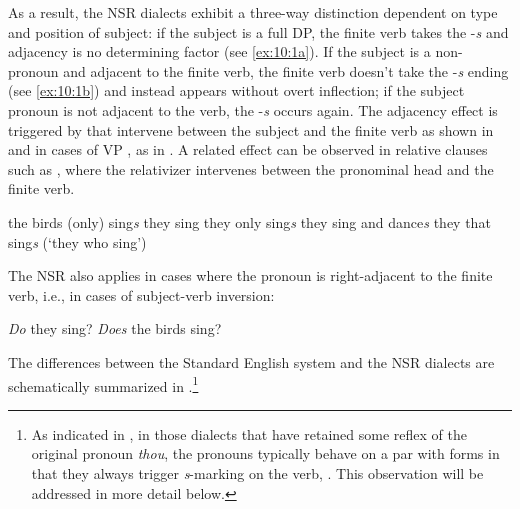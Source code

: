 \documentclass[output=paper]{langsci/langscibook}
\begin{document}
As a result, the \gls{NSR} dialects exhibit a three-way distinction dependent
on type and position of subject: if the subject is a full DP, the finite verb
takes the -\emph{s} and adjacency is no determining factor (see \ref{ex:10:1a}). If the
subject is a non-\Tsg{} pronoun and adjacent to the finite verb, the finite
verb doesn't take the -\emph{s} ending (see \ref{ex:10:1b}) and instead appears without
overt inflection; if the subject pronoun is not adjacent to the verb, the
-\emph{s} occurs again. The adjacency effect is triggered by  that
intervene between the subject and the finite verb as shown in  and in cases
of VP , as in . A related effect can be observed in relative
clauses such as , where the relativizer intervenes between the pronominal
head and the finite verb.

\ea\label{ex:10:1}
	\ea\label{ex:10:1a} the birds (only) sing\textit{s}
	\ex\label{ex:10:1b} they sing
	\ex\label{ex:10:1c} they only sing\textit{s}
	\ex\label{ex:10:1d} they sing and dance\textit{s}
	\ex\label{ex:10:1e} they that sing\textit{s} (`they who sing')
    \label{nsrexs}
    \z
\z

The \gls{NSR} also applies in cases where the pronoun is right-adjacent to the finite verb, i.e., in cases of subject-verb inversion:

\ea
	\ea \textit{Do} they sing?
	\ex \textit{Does} the birds sing?
    \z
\z

The differences between the Standard English  system and the \gls{NSR}
dialects are schematically summarized in .\footnote{As
indicated in , in those dialects that have retained some reflex
of the original \Ssg{} pronoun \emph{thou}, the \Ssg{} pronouns typically
behave on a par with \Tsg{} forms in that they always trigger \emph{s}-marking
on the verb, \textcite[76]{Pietsch:2005b}. This observation will be addressed in more
detail below.}\largerpage
\end{document}
